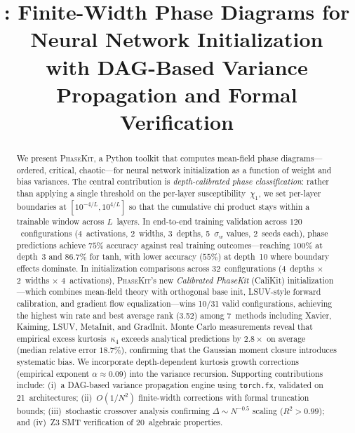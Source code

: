 \documentclass[10pt]{article}
\title{\ToolName{}: Finite-Width Phase Diagrams for Neural Network Initialization\\with DAG-Based Variance Propagation and Formal Verification}
\author{}
\date{}
\newcommand{\ToolName}{\textsc{PhaseKit}}
\begin{document}
\maketitle

\begin{abstract}
We present \ToolName{}, a Python toolkit that computes mean-field phase diagrams---ordered, critical, chaotic---for neural network initialization as a function of weight and bias variances.
The central contribution is \emph{depth-calibrated phase classification}: rather than applying a single threshold on the per-layer susceptibility~$\chi_1$, we set per-layer boundaries at $[10^{-4/L}, 10^{4/L}]$ so that the cumulative chi product stays within a trainable window across $L$~layers.
In end-to-end training validation across $120$~configurations (4~activations, 2~widths, 3~depths, 5~$\sigma_w$ values, 2~seeds each), phase predictions achieve $75\%$ accuracy against real training outcomes---reaching $100\%$ at depth~3 and $86.7\%$ for tanh, with lower accuracy ($55\%$) at depth~10 where boundary effects dominate.
In initialization comparisons across 32~configurations (4~depths $\times$ 2~widths $\times$ 4~activations), \ToolName{}'s new \emph{Calibrated PhaseKit} (CaliKit) initialization---which combines mean-field theory with orthogonal base init, LSUV-style forward calibration, and gradient flow equalization---wins 10/31 valid configurations, achieving the highest win rate and best average rank (3.52) among 7~methods including Xavier, Kaiming, LSUV, MetaInit, and GradInit.
Monte Carlo measurements reveal that empirical excess kurtosis~$\kappa_4$ exceeds analytical predictions by $2.8\times$ on average (median relative error $18.7\%$), confirming that the Gaussian moment closure introduces systematic bias.
We incorporate depth-dependent kurtosis growth corrections (empirical exponent $\alpha \approx 0.09$) into the variance recursion.
Supporting contributions include: (i)~a DAG-based variance propagation engine using \texttt{torch.fx}, validated on 21~architectures; (ii)~$O(1/N^2)$ finite-width corrections with formal truncation bounds; (iii)~stochastic crossover analysis confirming $\Delta \sim N^{-0.5}$ scaling ($R^2 > 0.99$); and (iv)~Z3 SMT verification of 20~algebraic properties.
\end{abstract}

\end{document}
